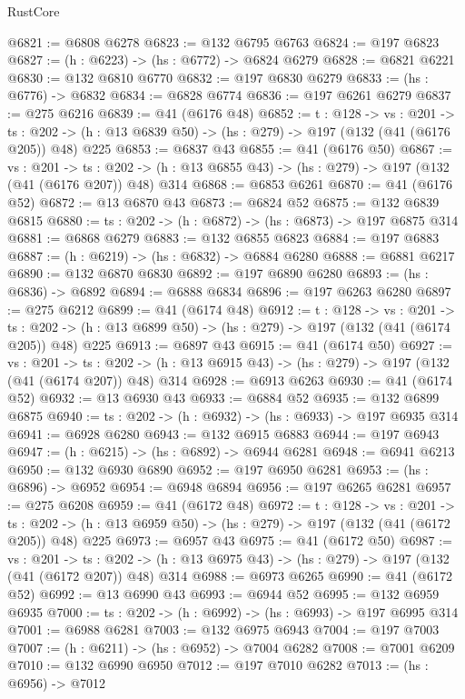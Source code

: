 \begin{lexlean}{RustCore}
\begin{coremodule}
@6821 := @6808 @6278
@6823 := @132 @6795 @6763
@6824 := @197 @6823
@6827 := (h : @6223) -> (hs : @6772) -> @6824 @6279
@6828 := @6821 @6221
@6830 := @132 @6810 @6770
@6832 := @197 @6830 @6279
@6833 := (hs : @6776) -> @6832
@6834 := @6828 @6774
@6836 := @197 @6261 @6279
@6837 := @275 @6216
@6839 := @41 (@6176 @48)
@6852 := {t : @128} ->
  {vs : @201} ->
  {ts : @202} -> (h : @13 @6839 @50) -> (hs : @279) -> @197 (@132 (@41 (@6176 @205)) @48) @225
@6853 := @6837 @43
@6855 := @41 (@6176 @50)
@6867 := {vs : @201} ->
  {ts : @202} -> (h : @13 @6855 @43) -> (hs : @279) -> @197 (@132 (@41 (@6176 @207)) @48) @314
@6868 := @6853 @6261
@6870 := @41 (@6176 @52)
@6872 := @13 @6870 @43
@6873 := @6824 @52
@6875 := @132 @6839 @6815
@6880 := {ts : @202} -> (h : @6872) -> (hs : @6873) -> @197 @6875 @314
@6881 := @6868 @6279
@6883 := @132 @6855 @6823
@6884 := @197 @6883
@6887 := (h : @6219) -> (hs : @6832) -> @6884 @6280
@6888 := @6881 @6217
@6890 := @132 @6870 @6830
@6892 := @197 @6890 @6280
@6893 := (hs : @6836) -> @6892
@6894 := @6888 @6834
@6896 := @197 @6263 @6280
@6897 := @275 @6212
@6899 := @41 (@6174 @48)
@6912 := {t : @128} ->
  {vs : @201} ->
  {ts : @202} -> (h : @13 @6899 @50) -> (hs : @279) -> @197 (@132 (@41 (@6174 @205)) @48) @225
@6913 := @6897 @43
@6915 := @41 (@6174 @50)
@6927 := {vs : @201} ->
  {ts : @202} -> (h : @13 @6915 @43) -> (hs : @279) -> @197 (@132 (@41 (@6174 @207)) @48) @314
@6928 := @6913 @6263
@6930 := @41 (@6174 @52)
@6932 := @13 @6930 @43
@6933 := @6884 @52
@6935 := @132 @6899 @6875
@6940 := {ts : @202} -> (h : @6932) -> (hs : @6933) -> @197 @6935 @314
@6941 := @6928 @6280
@6943 := @132 @6915 @6883
@6944 := @197 @6943
@6947 := (h : @6215) -> (hs : @6892) -> @6944 @6281
@6948 := @6941 @6213
@6950 := @132 @6930 @6890
@6952 := @197 @6950 @6281
@6953 := (hs : @6896) -> @6952
@6954 := @6948 @6894
@6956 := @197 @6265 @6281
@6957 := @275 @6208
@6959 := @41 (@6172 @48)
@6972 := {t : @128} ->
  {vs : @201} ->
  {ts : @202} -> (h : @13 @6959 @50) -> (hs : @279) -> @197 (@132 (@41 (@6172 @205)) @48) @225
@6973 := @6957 @43
@6975 := @41 (@6172 @50)
@6987 := {vs : @201} ->
  {ts : @202} -> (h : @13 @6975 @43) -> (hs : @279) -> @197 (@132 (@41 (@6172 @207)) @48) @314
@6988 := @6973 @6265
@6990 := @41 (@6172 @52)
@6992 := @13 @6990 @43
@6993 := @6944 @52
@6995 := @132 @6959 @6935
@7000 := {ts : @202} -> (h : @6992) -> (hs : @6993) -> @197 @6995 @314
@7001 := @6988 @6281
@7003 := @132 @6975 @6943
@7004 := @197 @7003
@7007 := (h : @6211) -> (hs : @6952) -> @7004 @6282
@7008 := @7001 @6209
@7010 := @132 @6990 @6950
@7012 := @197 @7010 @6282
@7013 := (hs : @6956) -> @7012

\end{coremodule}
\end{lexlean}
